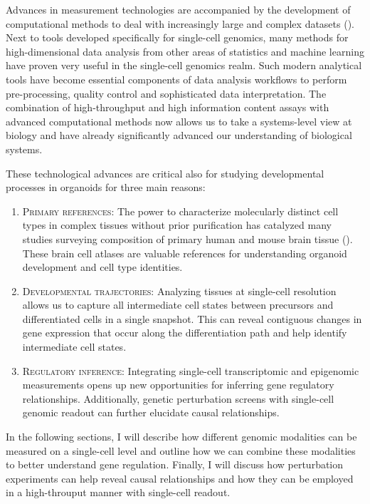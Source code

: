 Advances in measurement technologies are accompanied by the development of computational methods to deal with increasingly large and complex datasets (\cite{zappia_exploring_2018}). Next to tools developed specifically for single-cell genomics, many methods for high-dimensional data analysis from other areas of statistics and machine learning have proven very useful in the single-cell genomics realm. Such modern analytical tools have become essential components of data analysis workflows to perform pre-processing, quality control and sophisticated data interpretation. The combination of high-throughput and high information content assays with advanced computational methods now allows us to take a systems-level view at biology and have already significantly advanced our understanding of biological systems.

These technological advances are critical also for studying developmental processes in organoids for three main reasons:

\begin{enumerate}
    \item {\scshape Primary references}: The power to characterize molecularly distinct cell types in complex tissues without prior purification has catalyzed many studies surveying composition of primary human and mouse brain tissue (\cite{la_manno_molecular_2021,zeisel_molecular_2018,polioudakis_single-cell_2019,mayer_developmental_2018}). These brain cell atlases are valuable references for understanding organoid development and cell type identities.
    \item {\scshape Developmental trajectories}: Analyzing tissues at single-cell resolution allows us to capture all intermediate cell states between precursors and differentiated cells in a single snapshot. This can reveal contiguous changes in gene expression that occur along the differentiation path and help identify intermediate cell states. 
    \item {\scshape Regulatory inference}: Integrating single-cell transcriptomic and epigenomic measurements opens up new opportunities for inferring gene regulatory relationships. Additionally, genetic perturbation screens with single-cell genomic readout can further elucidate causal relationships.
  \end{enumerate}

In the following sections, I will describe how different genomic modalities can be measured on a single-cell level and outline how we can combine these modalities to better understand gene regulation. Finally, I will discuss how perturbation experiments can help reveal causal relationships and how they can be employed in a high-throuput manner with single-cell readout.


